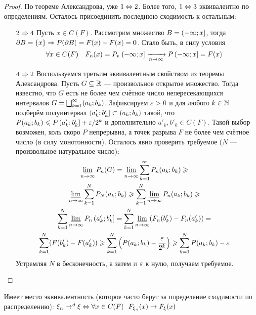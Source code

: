 \begin{proof}
	По теореме Александрова, уже $1 \Leftrightarrow 2$. Более того, $1 \Leftrightarrow 3$ эквивалентно по определениям. Осталось присоединить последнюю сходимость к остальным:
	\begin{itemize}
		\item[$2 \Rightarrow 4$] Пусть $x \in C(F)$. Рассмотрим множество $B = \left(-\infty; x\right]$, тогда $\partial B = \{x\} \Rightarrow P(\partial B) = F(x) - F(x) = 0$. Стало быть, в силу условия
		\[
			\forall x \in C(F) \quad F_n(x) = P_n\left(-\infty; x\right] \xrightarrow[n \to \infty]{} P\left(-\infty; x\right] = F(x)
		\]
		
		\item[$4 \Rightarrow 2$] Воспользуемся третьим эквивалентным свойством из теоремы Александрова. Пусть $G \subseteq \mathbb{R}$ --- произвольное открытое множество. Тогда известно, что $G$ есть не более чем счётное число непересекающихся интервалов $G = \bigsqcup_{k = 1}^\infty (a_k; b_k)$. Зафиксируем $\varepsilon > 0$ и для любого $k \in \mathbb{N}$ подберём полуинтервал $\left(a'_k; b'_k\right] \subset (a_k; b_k)$ такой, что $P(a_k; b_k) \leqslant P\left(a'_k; b'_k\right] + \varepsilon / 2^k$ и дополнительно $a'_k, b'_k \in C(F)$. Такой выбор возможен, коль скоро $P$ непрерывна, а точек разрыва $F$ не более чем счётное число (в силу монотонности). Осталось явно проверить требуемое ($N$ --- произвольное натуральное число):
		\begin{multline*}
			\varliminf_{n \to \infty} P_n(G) = \varliminf_{n \to \infty} \sum_{k = 1}^\infty P_n(a_k; b_k) \geqslant
			\\
			\varliminf_{n \to \infty} \sum_{k = 1}^N P_N(a_k; b_k) \geqslant \sum_{k = 1}^N \varliminf_{n \to \infty} P_n(a_k; b_k) \geqslant
			\\
			\sum_{k = 1}^N \varliminf_{n \to \infty} P_n\left(a'_k; b'_k\right] = \sum_{k = 1}^N \varliminf_{n \to \infty} (F_n(b'_k) - F_n(a'_k)) =
			\\
			\sum_{k = 1}^N (F(b'_k) - F(a'_k)) \geqslant \sum_{k = 1}^N \left(P(a_k; b_k) - \frac{\varepsilon}{2^k}\right) \geqslant \sum_{k = 1}^N P(a_k; b_k) - \varepsilon
		\end{multline*}
		Устремляя $N$ в бесконечность, а затем и $\varepsilon$ к нулю, получаем требуемое.
	\end{itemize}
\end{proof}

\begin{corollary}
	Имеет место эквивалентность (которое часто берут за определение сходимости по распределению): $\xi_n \to^d \xi \Leftrightarrow \forall x \in C(F)\ \ F_{\xi_n}(x) \to F_\xi(x)$
\end{corollary}

